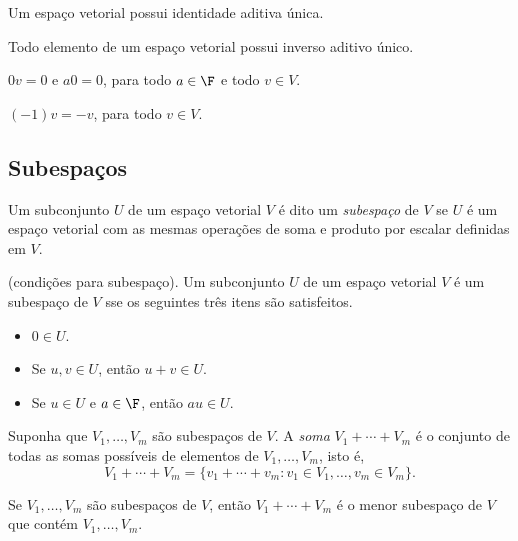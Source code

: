 \documentclass{article}
\begin{document}
\begin{prop}
    Um espaço vetorial possui identidade aditiva única.
\end{prop}

\begin{prop}
    Todo elemento de um espaço vetorial possui inverso aditivo único.
\end{prop}

\begin{prop}
    \(0v = 0\) e \(a0 = 0\), para todo \(a \in \F\) e todo \(v \in V\).
\end{prop}

\begin{prop}
    \((-1)v = -v\), para todo \(v \in V\).
\end{prop}

\subsection{Subespaços}
\begin{defn}
    Um subconjunto \(U\) de um espaço vetorial \(V\) é dito um \emph{subespaço} de \(V\) se \(U\) é um espaço vetorial com as mesmas operações de soma e produto por escalar definidas em \(V\).
\end{defn}

\begin{prop} (condições para subespaço).
    Um subconjunto \(U\) de um espaço vetorial \(V\) é um subespaço de \(V\) sse os seguintes três itens são satisfeitos.
    \begin{itemize}
        \item \(0 \in U\).
        \item Se \(u, v \in U\), então \(u + v \in U\).
        \item Se \(u \in U\) e \(a \in \F\), então \(au \in U\).
    \end{itemize}
\end{prop}

\begin{defn}
    Suponha que \(V_1,\ldots,V_m\) são subespaços de \(V\). A \emph{soma} \(V_1 + \cdots + V_m\) é o conjunto de todas as somas possíveis de elementos de \(V_1, \ldots, V_m\), isto é,
    \[
        V_1 + \cdots + V_m = \{v_1 + \cdots + v_m : v_1 \in V_1, \ldots, v_m \in V_m\}.
    \]
\end{defn}

\begin{prop}
    Se \(V_1, \ldots, V_m\) são subespaços de \(V\), então \(V_1 + \cdots + V_m\) é o menor subespaço de \(V\) que contém \(V_1, \ldots, V_m\).
\end{prop}
\end{document}
